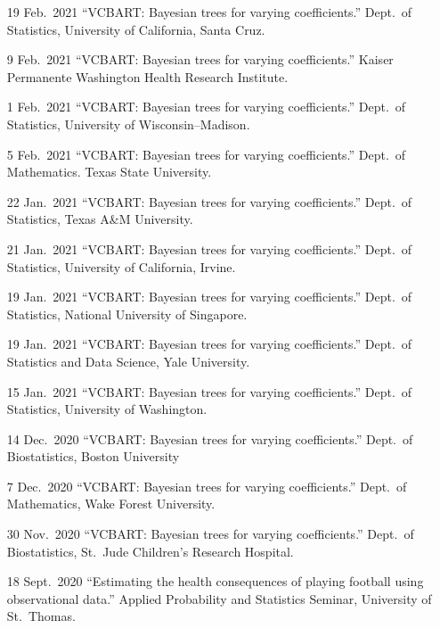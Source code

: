 \documentclass[margin]{res}
\begin{document}
\begin{resume}
\begin{itemize}
\item[19 Feb.~2021]{``VCBART: Bayesian trees for varying coefficients.'' Dept.~of Statistics, University of California, Santa Cruz.}

\item[9 Feb.~2021]{``VCBART: Bayesian trees for varying coefficients.'' Kaiser Permanente Washington Health Research Institute.}

\item[1 Feb.~2021]{``VCBART: Bayesian trees for varying coefficients.'' Dept.~of Statistics, University of Wisconsin--Madison.}

\item[5 Feb.~2021]{``VCBART: Bayesian trees for varying coefficients.'' Dept.~of Mathematics. Texas State University.}

\item[22 Jan.~2021]{``VCBART: Bayesian trees for varying coefficients.'' Dept.~of Statistics, Texas A\&M University.}

\item[21 Jan.~2021]{``VCBART: Bayesian trees for varying coefficients.'' Dept.~of Statistics, University of California, Irvine.}

\item[19 Jan.~2021]{``VCBART: Bayesian trees for varying coefficients.'' Dept.~of Statistics, National University of Singapore.}

\item[19 Jan.~2021]{``VCBART: Bayesian trees for varying coefficients.'' Dept.~of Statistics and Data Science, Yale University.}

\item[15 Jan.~2021]{``VCBART: Bayesian trees for varying coefficients.'' Dept.~of Statistics, University of Washington.}

\item[14 Dec.~2020]{``VCBART: Bayesian trees for varying coefficients.'' Dept.~of Biostatistics, Boston University}

\item[7 Dec.~2020]{``VCBART: Bayesian trees for varying coefficients.'' Dept.~of Mathematics, Wake Forest University.}

\item[30 Nov.~2020]{``VCBART: Bayesian trees for varying coefficients.'' Dept.~of Biostatistics, St.~Jude Children's Research Hospital.}

\item[18 Sept.~2020]{``Estimating the health consequences of playing football using observational data.'' Applied Probability and Statistics Seminar, University of St.~Thomas.} 


\end{itemize}
\end{resume}
\end{document}
